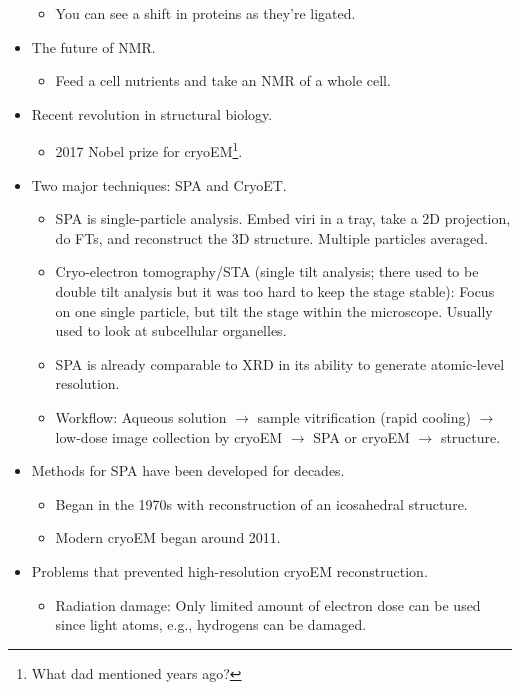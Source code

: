 \documentclass[../notes.tex]{subfiles}
\begin{document}
\begin{itemize}
\begin{itemize}
        \item You can see a shift in proteins as they're ligated.
    \end{itemize}
    \item The future of NMR.
    \begin{itemize}
        \item Feed a cell nutrients and take an NMR of a whole cell.
    \end{itemize}
    \item Recent revolution in structural biology.
    \begin{itemize}
        \item 2017 Nobel prize for cryoEM\footnote{What dad mentioned years ago?}.
    \end{itemize}
    \item Two major techniques: SPA and CryoET.
    \begin{itemize}
        \item SPA is single-particle analysis. Embed viri in a tray, take a 2D projection, do FTs, and reconstruct the 3D structure. Multiple particles averaged.
        \item Cryo-electron tomography/STA (single tilt analysis; there used to be double tilt analysis but it was too hard to keep the stage stable): Focus on one single particle, but tilt the stage within the microscope. Usually used to look at subcellular organelles.
        \item SPA is already comparable to XRD in its ability to generate atomic-level resolution.
        \item Workflow: Aqueous solution $\to$ sample vitrification (rapid cooling) $\to$ low-dose image collection by cryoEM $\to$ SPA or cryoEM $\to$ structure.
    \end{itemize}
    \item Methods for SPA have been developed for decades.
    \begin{itemize}
        \item Began in the 1970s with reconstruction of an icosahedral structure.
        \item Modern cryoEM began around 2011.
    \end{itemize}
    \item Problems that prevented high-resolution cryoEM reconstruction.
    \begin{itemize}
        \item Radiation damage: Only limited amount of electron dose can be used since light atoms, e.g., hydrogens can be damaged.

\end{itemize}
\end{itemize}
\end{document}
